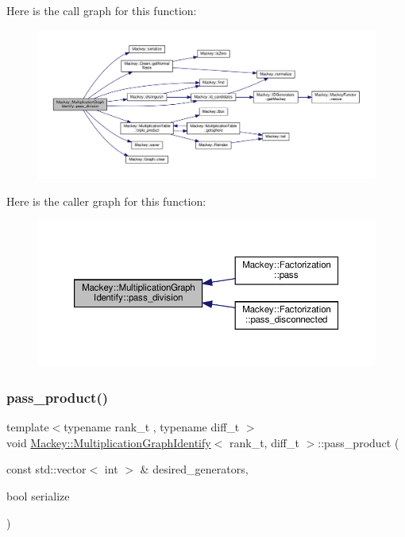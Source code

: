 Here is the call graph for this function\+:\nopagebreak
\begin{figure}[H]
\begin{center}
\leavevmode
\includegraphics[width=350pt]{classMackey_1_1MultiplicationGraphIdentify_a5c945ebff968abe788e22b025b2455ed_cgraph}
\end{center}
\end{figure}
Here is the caller graph for this function\+:\nopagebreak
\begin{figure}[H]
\begin{center}
\leavevmode
\includegraphics[width=350pt]{classMackey_1_1MultiplicationGraphIdentify_a5c945ebff968abe788e22b025b2455ed_icgraph}
\end{center}
\end{figure}
\mbox{\label{classMackey_1_1MultiplicationGraphIdentify_af3019970f4431d1930f75418fb134441}} 
\subsubsection{\texorpdfstring{pass\+\_\+product()}{pass\_product()}}
{\footnotesize\ttfamily template$<$typename rank\+\_\+t , typename diff\+\_\+t $>$ \\
void \hyperlink{classMackey_1_1MultiplicationGraphIdentify}{Mackey\+::\+Multiplication\+Graph\+Identify}$<$ rank\+\_\+t, diff\+\_\+t $>$\+::pass\+\_\+product (\begin{DoxyParamCaption}\item[{const std\+::vector$<$ int $>$ \&}]{desired\+\_\+generators,  }\item[{bool}]{serialize }\end{DoxyParamCaption})\hspace{0.3cm}{\ttfamily [protected]}}



